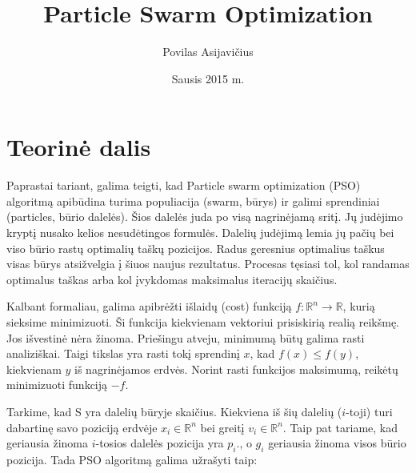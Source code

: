 \documentclass[12pt,a4paper]{article}
\title{Particle Swarm Optimization}
\author{Povilas Asijavičius }
\date{Sausis 2015 m.}
\begin{document}
\maketitle

\section{Teorinė dalis}


Paprastai tariant, galima teigti, kad Particle swarm optimization (PSO) algoritmą apibūdina turima populiacija (swarm, būrys) ir galimi sprendiniai (particles, būrio dalelės). Šios dalelės juda po visą nagrinėjamą sritį. Jų judėjimo kryptį nusako kelios nesudėtingos formulės. Dalelių judėjimą lemia jų pačių bei viso būrio rastų optimalių taškų pozicijos. Radus geresnius optimalius taškus visas būrys atsižvelgia į šiuos naujus rezultatus. Procesas tęsiasi tol, kol randamas optimalus taškas arba kol įvykdomas maksimalus iteracijų skaičius.

Kalbant formaliau, galima apibrėžti išlaidų (cost) funkciją $ f: \mathbb{R}^n \rightarrow \mathbb{R}$, kurią sieksime minimizuoti. Ši funkcija kiekvienam vektoriui prisiskirią realią reikšmę. Jos išvestinė nėra žinoma. Priešingu atveju, minimumą būtų galima rasti analiziškai. Taigi tikslas yra rasti tokį sprendinį $x$, kad $f(x) \leq f(y)$, kiekvienam $y$ iš nagrinėjamos erdvės. Norint rasti funkcijos maksimumą, reikėtų minimizuoti funkciją $-f$.

Tarkime, kad S yra dalelių būryje skaičius. Kiekviena iš šių dalelių ($i$-toji) turi dabartinę savo poziciją erdvėje $x_i \in \mathbb{R}^n$ bei greitį $v_i \in \mathbb{R}^n$. Taip pat tariame, kad geriausia žinoma $i$-tosios dalelės pozicija yra $p_i$., o $g_i$ geriausia žinoma visos būrio pozicija. Tada PSO algoritmą galima užrašyti taip:
\end{document}

